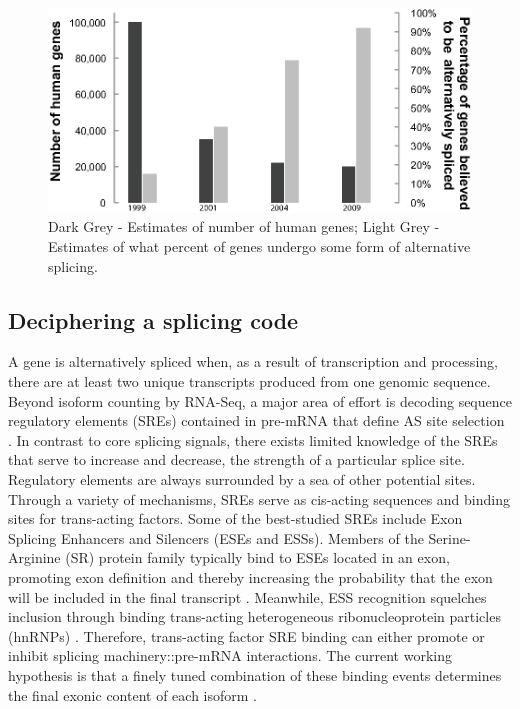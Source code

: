     \begin{figure} %
      \centering 
      \includegraphics{Figures/Intro/numberHumanGenesAndNumberSpliced}
      \caption[Estimates of number of human genes, and percentage alternatively spliced over time]
      {
      Dark Grey - Estimates of number of human genes; Light Grey - Estimates of what percent of genes undergo some form of alternative splicing.
      }
      \label{Intro:fig:numGenesAndNumSpliced}
      \end{figure}


  \subsection{Deciphering a splicing code}\label{Intro:subsec:Splicing Code}

    A gene is alternatively spliced when, as a result of transcription and processing, there are at least two unique transcripts produced from one genomic sequence. Beyond isoform counting by RNA-Seq, a major area of effort is decoding sequence regulatory elements (SREs) contained in pre-mRNA that define AS site selection \citep{Wang2008}. In contrast to core splicing signals, there exists limited knowledge of the SREs that serve to increase and decrease, the strength of a particular splice site. Regulatory elements are always surrounded by a sea of other potential sites. Through a variety of mechanisms, SREs serve as cis-acting sequences and binding sites for trans-acting factors. Some of the best-studied SREs include Exon Splicing Enhancers and Silencers (ESEs and ESSs). Members of the Serine-Arginine (SR) protein family typically bind to ESEs located in an exon, promoting exon definition and thereby increasing the probability that the exon will be included in the final transcript \citep{Graveley2000,Long2009}. Meanwhile, ESS recognition  squelches inclusion through binding trans-acting heterogeneous ribonucleoprotein particles (hnRNPs) \citep{Martinez-Contreras2007}. Therefore, trans-acting factor SRE binding can either promote or inhibit splicing machinery::pre-mRNA interactions. The current working hypothesis is that a finely tuned combination of these binding events determines the final exonic content of each isoform \citep{House2008}.

